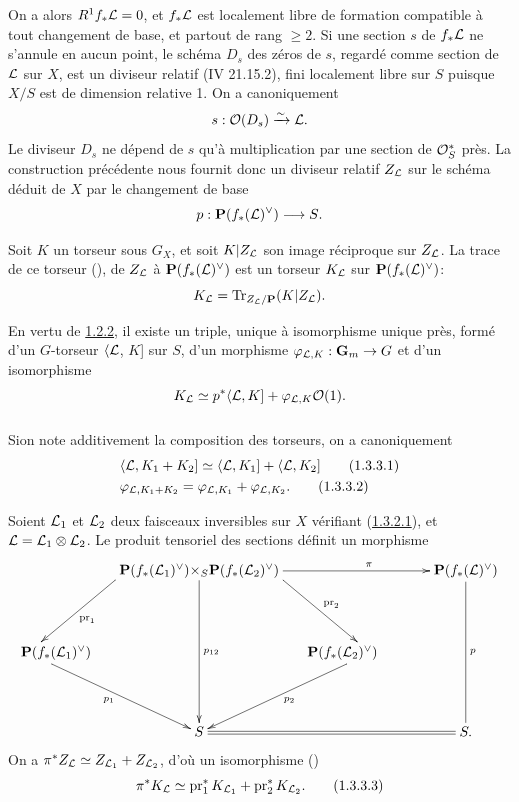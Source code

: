 \documentclass[10pt]{../fichiers-configuration-latex/smfart}
\begin{document}
On a alors $R^{1}f_{\ast}{\mathcal L}=0$, et $f_{\ast}{\mathcal L}$ est
localement libre de formation compatible à tout changement de base, et
partout de rang $\geq 2$. Si une section $s$ de $f_{\ast}{\mathcal L}$
ne s'annule en aucun point, le schéma $D_{s}$ des zéros de $s$,
regardé comme section de ${\mathcal L}$ sur $X$, est un diviseur
relatif (\EGA IV 21.15.2), fini localement libre sur $S$ puisque $X/S$
est de dimension relative 1. On a canoniquement
$$
s:{\mathcal O}(D_{s})\xrightarrow{\sim}{\mathcal L}{}.
$$
Le diviseur $D_{s}$ ne dépend de $s$ qu'à multiplication par une
section de ${\mathcal O}^{\ast}_{S}$ près. La construction
précédente nous fournit donc un diviseur relatif $Z_{{\mathcal L}}$ sur
le schéma déduit de $X$ par le changement de base
$$
p:\mathbf{P}(f_{\ast}({\mathcal L})^{\vee})\longrightarrow S{}.
$$

Soit $K$ un torseur sous $G_{X}$, et soit $K|Z_{{\mathcal L}}$ son
image réciproque sur $Z_{{\mathcal L}}$. La trace de ce torseur 
(), de $Z_{{\mathcal L}}$ à
$\mathbf{P}(f_{\ast}({\mathcal L})^{\vee})$ est un torseur
$K_{{\mathcal L}}$ sur $\mathbf{P}(f_{\ast}({\mathcal L})^{\vee})$:
$$
K_{{\mathcal L}}=\operatorname{Tr}_{Z_{{\mathcal L}}/\mathbf{P}}(K|Z_{{\mathcal L}}){}.
$$

En vertu de \hyperref[XVIII.thm1.2.2]{1.2.2}, il existe un triple, unique à
isomorphisme unique 
près, formé d'un $G$-torseur $\langle {\mathcal L}$, $K$] sur $S$, d'un
morphisme $\varphi_{{\mathcal L},K}:\mathbf{G}_{m}\rightarrow G$ et
d'un isomorphisme
$$
K_{{\mathcal L}}\simeq
p^{\ast}\langle {\mathcal L},K]+\varphi_{{\mathcal L},K}{\mathcal O}(1){}.
$$

\subsubsection{}
Si\pageoriginale on note additivement la composition des torseurs, on
a canoniquement
\begin{align*}
& \langle {\mathcal L},K_{1}+K_{2}] \simeq
\langle {\mathcal L},K_{1}]+\langle {\mathcal L},K_{2}]\tag{1.3.3.1}\\
& \varphi_{{\mathcal L}, K_{1}+K_{2}}=\varphi_{{\mathcal L},K_{1}}+\varphi_{{\mathcal L},K_{2}}{}.\tag{1.3.3.2}
\end{align*}

Soient ${\mathcal L}_{1}$ et ${\mathcal L}_{2}$ deux faisceaux
inversibles sur $X$ vérifiant (\hyperref[XVIII.par1.3.2.1]{1.3.2.1}), et
${\mathcal L}={\mathcal L}_{1}\otimes {\mathcal L}_{2}$. Le produit
tensoriel des sections définit un morphisme
$$
\xymatrix@R=1.5cm@C=.5cm{
 & **[r] \PP
  (f_{\ast}(\Ll_1)^{\vee}) \ar[ld]^{\pr_1}& \times_S \ar[dd]^{p_{12}}& **[l]\PP
  (f_{\ast}(\Ll_2)^{\vee})\ar[rr]^{\pi}\ar[rd]^{\pr_2} &     &
 \PP(f_{\ast}(\Ll)^{\vee}) \ar@{-}[dd]^{p}\\
**[r]\PP(f_*(\Ll_1)^{\vee})\ar[rrd]_{p_1}&          &                &                 &  **[l]\PP(f_{\ast}(\Ll_2)^{\vee}) \ar[lld]^{p_2}  &\\
 &          &  S     \ar@{=}[rrr]        &                 &      & S.
}
$$
On a $\pi^{\ast}Z_{{\mathcal L}}\simeq Z_{{\mathcal L}_{1}}+Z_{{\mathcal L}_{2}}$, d'où un
isomorphisme ()
\begin{equation*}
\pi^{\ast}K_{{\mathcal L}}\simeq\operatorname{pr}^{\ast}_{1}K_{{\mathcal L}_{1}}+\operatorname{pr}^{\ast}_{2}K_{{\mathcal L}_{2}}{}.\tag{1.3.3.3}
\end{equation*}
\end{document}
